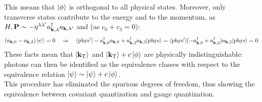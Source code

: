 This means that $ \ket{\phi} $ is orthogonal to all physical states. Moreover, only transverse states contribute to the energy and to the momentum, as $ H , \mathbf{P} \sim - \eta^{\lambda \lambda'} a_{\mathbf{k},\lambda}^\dagger a_{\mathbf{k},\lambda'} $ and (as $ c_0 + c_3 = 0 $):
\begin{equation*}
  (a_{\mathbf{k},0} - a_{\mathbf{k},3}) \ket{\psi} = 0
  \quad \Rightarrow \quad
  \braket{\text{phys}' | -a_{\mathbf{k},0}^\dagger a_{\mathbf{k},0} + a_{\mathbf{k},3}^\dagger a_{\mathbf{k},3} | \text{phys}} = \braket{\text{phys}' | (-a_{\mathbf{k},0}^\dagger + a_{\mathbf{k},3}^\dagger) a_{\mathbf{k},3} | \text{phys}} = 0
\end{equation*}
These facts mean that $ \ket{\mathbf{k}_\text{T}} $ and $ \ket{\mathbf{k}_\text{T}} + c \ket{\phi} $ are physically indistinguishable: photons can then be identified as the equivalence classes with respect to the equivalence relation $ \ket{\psi} \sim \ket{\psi} + c \ket{\phi} $. \\
This procedure has eliminated the spurious degrees of freedom, thus showing the equivalence between covariant quantization and gauge quantization.










